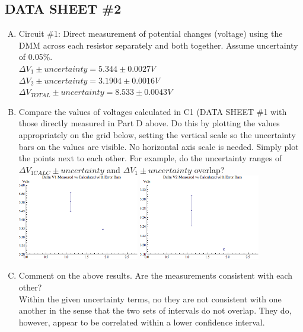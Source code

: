 \subsection{DATA SHEET \#2}
	\begin{enumerate}[A.]
		\item Circuit \#1: Direct measurement of potential changes (voltage) using the DMM across each resistor separately and both together.  Assume uncertainty of 0.05\%.\\
		
			$\Delta V_1 \pm uncertainty = 5.344 \pm 0.0027 V$\\
			$\Delta V_2 \pm uncertainty = 3.1904 \pm 0.0016 V$\\
			$\Delta V_{TOTAL} \pm uncertainty = 8.533 \pm 0.0043 V$\\
			
		\item Compare the values of voltages calculated in C1 (DATA SHEET \#1 with those directly measured in Part D above.  Do this by plotting the values appropriately on the grid below, setting the vertical scale so the uncertainty bars on the values are visible.  No horizontal axis scale is needed.  Simply plot the points next to each other.  For example, do the uncertainty ranges of $\Delta V_{1CALC} \pm uncertainty$ and $\Delta V_{1} \pm uncertainty$ overlap?\\
		
		\includegraphics[width=200px]{lab6_graph1_deltav1}
		\includegraphics[width=200px]{lab6_graph2_deltav2}
		
		\item Comment on the above results.  Are the measurements consistent with each other? \\
		
		Within the given uncertainty terms, no they are not consistent with one another in the sense that the two sets of intervals do not overlap.  They do, however, appear to be correlated within a lower confidence interval.
\end{enumerate}
		